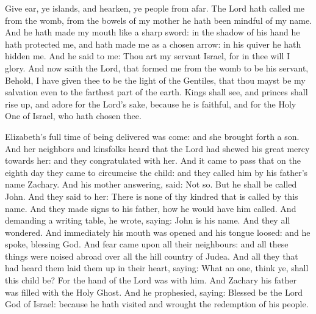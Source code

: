 Give ear, ye islands, and hearken, ye people from afar. The Lord
hath called me from the womb, from the bowels of my mother he hath been
mindful of my name.
And he hath made my mouth like a sharp sword: in the shadow of his
hand he hath protected me, and hath made me as a chosen arrow: in his
quiver he hath hidden me.
And he said to me: Thou art my servant Israel, for in thee will I
glory.
And now saith the Lord, that formed me from the womb to be his
servant, %
Behold, I have given thee to be the light of the Gentiles, that thou
mayst be my salvation even to the farthest part of the earth.
Kings shall see, and princes shall rise up, and adore for the
Lord's sake, because he is faithful, and for the Holy One of Israel, who
hath chosen thee.



Elizabeth's full time of being delivered was come: and she
brought forth a son.
And her neighbors and kinsfolks heard that the Lord had shewed his
great mercy towards her: and they congratulated with her.
And it came to pass that on the eighth day they came to circumcise
the child: and they called him by his father's name Zachary.
And his mother answering, said: Not so. But he shall be called
John.
And they said to her: There is none of thy kindred that is called
by this name.
And they made signs to his father, how he would have him called.
And demanding a writing table, he wrote, saying: John is his name.
And they all wondered.
And immediately his mouth was opened and his tongue loosed: and he
spoke, blessing God.
And fear came upon all their neighbours: and all these things were
noised abroad over all the hill country of Judea.
And all they that had heard them laid them up in their heart,
saying: What an one, think ye, shall this child be? For the hand of the
Lord was with him.
And Zachary his father was filled with the Holy Ghost. And he
prophesied, saying:
Blessed be the Lord God of Israel: because he hath visited and
wrought the redemption of his people.



